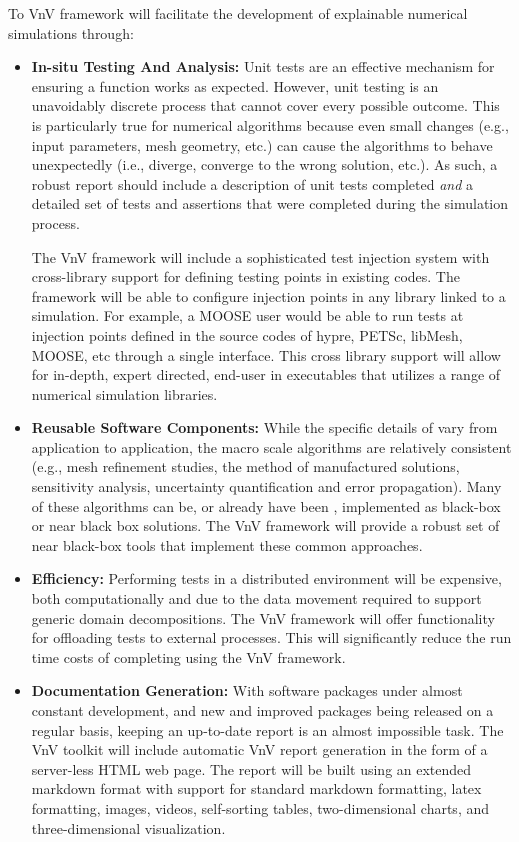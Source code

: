 To VnV framework will facilitate the development of explainable numerical simulations through:

\begin{itemize}
 
 \item{ \bf In-situ Testing And Analysis:} Unit tests are an effective mechanism for ensuring a function works as expected. However, unit testing is an unavoidably discrete process that cannot cover every possible outcome. This is particularly true for numerical algorithms because even small changes (e.g., input parameters, mesh geometry, etc.) can cause the algorithms to behave unexpectedly (i.e., diverge, converge to the wrong solution, etc.). As such, a robust \VV report should include a description of unit tests completed \emph{and} a detailed set of tests and assertions that were completed during the simulation process. 
 
 The VnV framework will include a sophisticated test injection system with cross-library support for defining testing points in existing codes. The framework will be able to configure injection points in any library linked to a simulation. For example, a MOOSE user would be able to run \VV tests at injection points defined in the source codes of hypre, PETSc, libMesh, MOOSE, etc through a single interface. This cross library support will allow for in-depth, expert directed, end-user \VV in executables that utilizes a range of numerical simulation libraries. 
 
 \item {\bf Reusable Software Components:} While the specific details of \VV vary from application to application, the macro scale algorithms are relatively consistent (e.g., mesh refinement studies, the method of manufactured solutions, sensitivity analysis, uncertainty quantification and error propagation). Many of these algorithms can be, or already have been \cite{DAKOTA},  implemented as black-box or near black box solutions. The VnV framework will provide a robust set of near black-box tools that implement these common \VV approaches. 
  
 \item{\bf Efficiency:}  Performing \VV tests in a distributed environment will be expensive, both computationally and due to the data movement required to support generic domain decompositions. The VnV framework will offer functionality for offloading tests to external processes. This will significantly reduce the run time costs of completing \VV using the VnV framework.
 
 \item{\bf Documentation Generation:} With software packages under almost constant development, and new and improved packages being released on a regular basis, keeping an up-to-date \VV report is an almost impossible task. The VnV toolkit will include automatic VnV report generation in the form of a server-less HTML web page. The report will be built using an extended markdown format with support for standard markdown formatting, latex formatting, images, videos, self-sorting tables, two-dimensional charts, and three-dimensional visualization. 
 \end{itemize}

